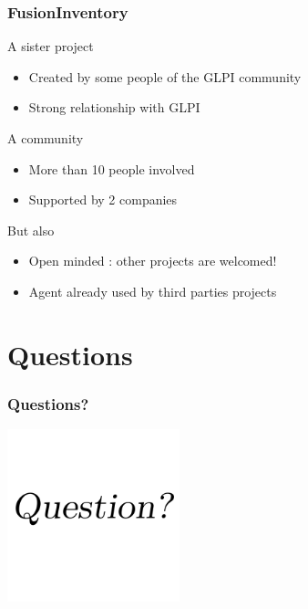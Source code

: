 \documentclass{beamer}
\begin{document}
\begin{frame}

    \frametitle{FusionInventory}

    \begin{block}{A sister project}
        \begin{itemize}
            \item Created by some people of the GLPI community
            \item Strong relationship with GLPI
        \end{itemize}
    \end{block}

    \begin{block}{A community}
        \begin{itemize}
            \item More than 10 people involved
            \item Supported by 2 companies
        \end{itemize}
    \end{block}

    \begin{block}{But also}
        \begin{itemize}
            \item Open minded : other projects are welcomed!
            \item Agent already used by third parties projects
        \end{itemize}
    \end{block}

\end{frame}

\section{Questions}

\begin{frame}
    \frametitle{Questions?}

    \begin{center}

    \includegraphics[height=5cm]{./pics/question.pdf}

    \end{center}

\end{frame}
\end{document}
